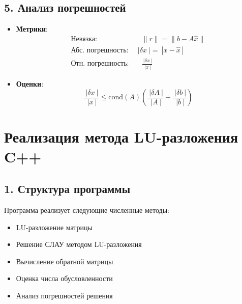 \documentclass[12pt, a4paper]{article}
\begin{document}
\subsection*{5. Анализ погрешностей}
\begin{itemize}
\item \textbf{Метрики}:
\begin{align*}
\text{Невязка}: &\quad \|r\| = \|b - A\hat{x}\| \\
\text{Абс. погрешность}: &\ \ |\delta x\ | = \ |x - \hat{x}\ | \\
\text{Отн. погрешность}: &\quad \frac{\ |\delta x\ |}{\ |x\ |}
\end{align*}
\item \textbf{Оценки}:
\begin{equation*}
\frac{\ |\delta x\ |}{\ |x\ |} \leq \text{cond}(A) \left( \frac{\ |\delta A\ |}{\ |A\ |} + \frac{\ |\delta b\ |}{\ |b\ |} \right)
\end{equation*}
\end{itemize}
\section*{Реализация метода LU-разложения C++}

\subsection*{1. Структура программы}
Программа реализует следующие численные методы:
\begin{itemize}
\item LU-разложение матрицы
\item Решение СЛАУ методом LU-разложения
\item Вычисление обратной матрицы
\item Оценка числа обусловленности
\item Анализ погрешностей решения
\end{itemize}
\end{document}
